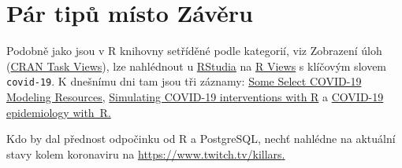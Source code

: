 \section{Pár tipů místo Závěru}

Podobně jako jsou v R knihovny setříděné podle kategorií, viz Zobrazení úloh (\href{https://cran.r-project.org/web/views/}{CRAN Task Views}), lze nahlédnout u 
\href{https://rstudio.com/}{RStudia} na \href{https://rviews.rstudio.com/tags/covid-19/}{R Views} s klíčovým slovem \texttt{covid-19}. K dnešnímu dni tam jsou tři záznamy: 
\href{https://rviews.rstudio.com/2020/04/07/some-select-covid-19-modeling-resources/}{Some Select COVID-19 Modeling Resources,}
\href{https://rviews.rstudio.com/2020/03/19/simulating-covid-19-interventions-with-r/}{Simulating COVID-19 interventions with R} a 
\href{https://rviews.rstudio.com/2020/03/05/covid-19-epidemiology-with-r/}{COVID-19 epidemiology with~R.}

Kdo by dal přednost odpočinku od R a PostgreSQL, nechť nahlédne na aktuální stavy kolem koronaviru na \href{https://www.twitch.tv/killars}{\url{https://www.twitch.tv/killars}.}







